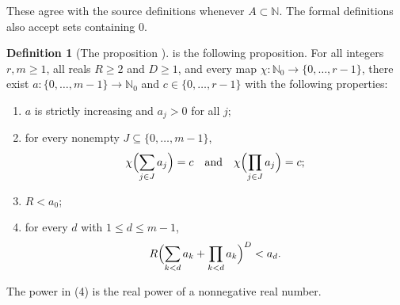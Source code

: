 \documentclass[11pt]{article}
\theoremstyle{definition}
\newtheorem{definition}[theorem]{Definition}
\theoremstyle{remark}
\newcommand{\leanname}[1]{\texttt{\detokenize{#1}}}
\newcommand{\NN}{\mathbb{N}}
\newcommand{\Nz}{\mathbb{N}_0}
\begin{document}
These agree with the source definitions whenever $A\subset\NN$. The formal definitions also accept sets containing $0$.

\begin{definition}[The proposition \leanname{Thm11}]
\leanname{Thm11} is the following proposition. For all integers $r,m\ge 1$, all reals $R\ge 2$ and $D\ge 1$, and every map $\chi:\Nz\to\{0,\ldots,r-1\}$, there exist $a:\{0,\ldots,m-1\}\to\Nz$ and $c\in\{0,\ldots,r-1\}$ with the following properties:
\begin{enumerate}
 \item $a$ is strictly increasing and $a_j>0$ for all $j$;
 \item for every nonempty $J\subseteq\{0,\ldots,m-1\}$,
 \[
 \chi\Bigl(\sum_{j\in J}a_j\Bigr)=c \quad\text{and}\quad \chi\Bigl(\prod_{j\in J}a_j\Bigr)=c;
 \]
 \item $R<a_0$;
 \item for every $d$ with $1\le d\le m-1$,
 \[
 R\Bigl(\sum_{k<d}a_k+\prod_{k<d}a_k\Bigr)^D<a_d .
 \]
\end{enumerate}
The power in (4) is the real power of a nonnegative real number.
\end{definition}
\end{document}
